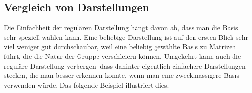 %
%
%

%
%
\subsection{Vergleich von Darstellungen}
Die Einfachheit der regulären Darstellung hängt davon ab, dass man die
Basis sehr speziell wählen kann.
Eine beliebige Darstellung ist auf den ersten Blick sehr viel weniger gut
durchschaubar, weil eine beliebig gewählte Basis zu Matrizen führt,
die die Natur der Gruppe verschleiern können.
Umgekehrt kann auch die reguläre Darstellung verbergen, dass dahinter
eigentlich einfachere Darstellungen stecken, die man besser erkennen
könnte, wenn man eine zweckmässigere Basis verwenden würde.
Das folgende Beispiel illustriert dies.


